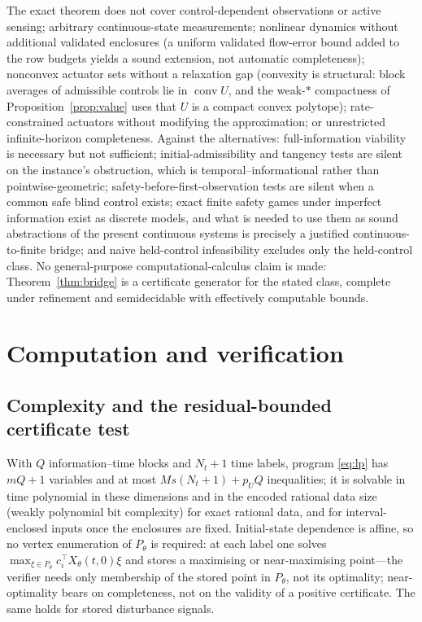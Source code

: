 \documentclass[11pt,a4paper]{article}
\theoremstyle{plain}
\theoremstyle{definition}
\theoremstyle{remark}
\DeclareMathOperator{\conv}{conv}
\begin{document}
The exact theorem does not cover control-dependent observations or active sensing; arbitrary continuous-state measurements; nonlinear dynamics without additional validated enclosures (a uniform validated flow-error bound added to the row budgets yields a sound extension, not automatic completeness); nonconvex actuator sets without a relaxation gap (convexity is structural: block averages of admissible controls lie in $\conv U$, and the weak-$\ast$ compactness of Proposition~\ref{prop:value} uses that $U$ is a compact convex polytope); rate-constrained actuators without modifying the approximation; or unrestricted infinite-horizon completeness. Against the alternatives: full-information viability is necessary but not sufficient; initial-admissibility and tangency tests are silent on the instance's obstruction, which is temporal--informational rather than pointwise-geometric; safety-before-first-observation tests are silent when a common safe blind control exists; exact finite safety games under imperfect information \cite{Chatterjee2007} exist as discrete models, and what is needed to use them as sound abstractions of the present continuous systems is precisely a justified continuous-to-finite bridge; and naive held-control infeasibility excludes only the held-control class. No general-purpose computational-calculus claim is made: Theorem~\ref{thm:bridge} is a certificate generator for the stated class, complete under refinement and semidecidable with effectively computable bounds.
\section{Computation and verification}\label{sec:computation}

\subsection{Complexity and the residual-bounded certificate test}

With $Q$ information--time blocks and $N_t+1$ time labels, program \eqref{eq:lp} has $mQ+1$ variables and at most $Ms(N_t{+}1)+p_UQ$ inequalities; it is solvable in time polynomial in these dimensions and in the encoded rational data size (weakly polynomial bit complexity) for exact rational data, and for interval-enclosed inputs once the enclosures are fixed. Initial-state dependence is affine, so no vertex enumeration of $P_\theta$ is required: at each label one solves $\max_{\xi\in P_\theta}c_i^\top X_\theta(t,0)\xi$ and stores a maximising or near-maximising point---the verifier needs only membership of the stored point in $P_\theta$, not its optimality; near-optimality bears on completeness, not on the validity of a positive certificate. The same holds for stored disturbance signals.
\end{document}
